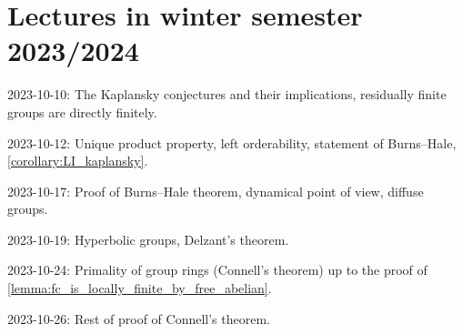 \chapter{Lectures in winter semester 2023/2024}

2023-10-10: The Kaplansky conjectures and their implications, residually finite groups are directly finitely.

2023-10-12: Unique product property, left orderability, statement of Burns--Hale, \cref{corollary:LI_kaplansky}.

2023-10-17: Proof of Burns--Hale theorem, dynamical point of view, diffuse groups.

2023-10-19: Hyperbolic groups, Delzant's theorem.

2023-10-24: Primality of group rings (Connell's theorem) up to the proof of \cref{lemma:fc_is_locally_finite_by_free_abelian}.

2023-10-26: Rest of proof of Connell's theorem.
